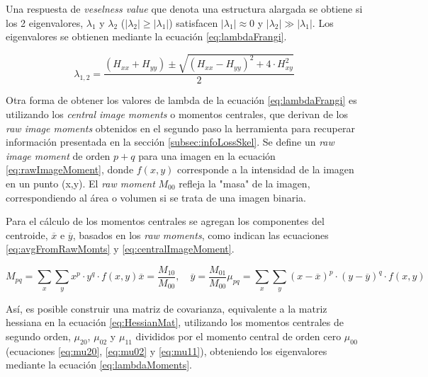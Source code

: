 Una respuesta de {\it veselness value} que denota una estructura alargada se obtiene si los 2 eigenvalores, $\lambda_1$ y $\lambda_2$ ($|\lambda_2| \geq |\lambda_1|$) satisfacen $|\lambda_1| \approx 0 $ y $|\lambda_2| \gg |\lambda_1|$. Los eigenvalores se obtienen mediante la ecuaci\'on \ref{eq:lambdaFrangi}.

\begin{equation}
    \label{eq:lambdaFrangi}
    \lambda_{1,2} = \dfrac{(H_{xx} + H_{yy}) \pm \sqrt{(H_{xx} - H_{yy})^{2} + 4\cdot H_{xy}^{2}     } }{2}
\end{equation}

Otra forma de obtener los valores de lambda de la ecuaci\'on \ref{eq:lambdaFrangi} es utilizando los {\it central image moments} o momentos centrales, que derivan de los {\it raw image moments} obtenidos en el segundo paso la herramienta para recuperar informaci\'on presentada en la secci\'on \ref{subsec:infoLossSkel}. Se define un {\it raw image moment} de orden $p+q$ para una imagen en la ecuaci\'on \eqref{eq:rawImageMoment}, donde $f(x,y)$ corresponde a la intensidad de la imagen en un punto (x,y). El {\it raw moment} $M_{00}$ refleja la "masa" de la imagen, correspondiendo al \'area o volumen si se trata de una imagen binaria. 

Para el c\'alculo de los momentos centrales se agregan los componentes del centroide, $\overline{x}$ e $\overline{y}$, basados en los {\it raw moments}, como indican las ecuaciones \eqref{eq:avgFromRawMomts} y \eqref{eq:centralImageMoment}.

\begin{subequations}
\begin{equation}
    \label{eq:rawImageMoment}
    M_{pq} = \sum\limits_{x} \sum\limits_{y} x^p \cdot y^q \cdot f(x,y)
\end{equation}
\begin{equation}
    \label{eq:avgFromRawMomts}
    \overline{x} = \frac{M_{10}}{M_{00}}, \quad
    \overline{y} = \frac{M_{01}}{M_{00}}
\end{equation}
\begin{equation}
    \label{eq:centralImageMoment}
    \mu_{pq} = \sum\limits_{x} \sum\limits_{y} (x - \overline{x})^{p} \cdot (y - \overline{y})^{q} \cdot f(x,y)
\end{equation}
\end{subequations}

As\'i, es posible construir una matriz de covarianza, equivalente a la matriz hessiana en la ecuaci\'on \eqref{eq:HessianMat}, utilizando los momentos centrales de segundo orden, $\mu_{20}$, $\mu_{02}$ y $\mu_{11}$ divididos por el momento central de orden cero $\mu_{00}$ (ecuaciones \eqref{eq:mu20}, \eqref{eq:mu02} y \eqref{eq:mu11}), obteniendo los eigenvalores mediante la ecuaci\'on \eqref{eq:lambdaMoments}.

